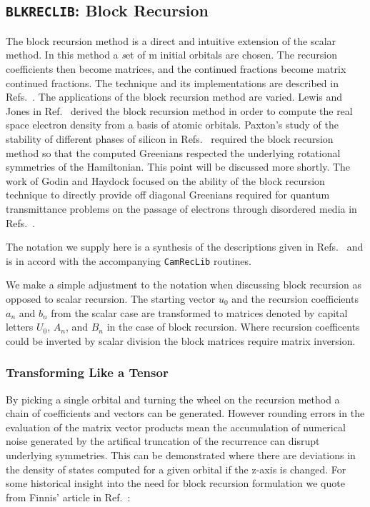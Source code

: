 \subsection{\texttt{BLKRECLIB}: Block Recursion}
The block recursion method is a direct and intuitive extension of the scalar method.
In this method a {\emph set of m} initial orbitals are chosen. The recursion
coefficients then become matrices, and the continued fractions become
matrix continued fractions. The technique and its implementations are described 
in Refs.~\cite{jones84, legrand85, inoue87, nex89, godin91}. 
The applications of the block recursion method are varied.
Lewis and Jones in Ref.~\cite{jones84} derived the block recursion method
in order to compute the real space electron density from a basis of atomic orbitals.
Paxton's study of the stability of different phases of silicon in 
Refs.~\cite{paxton87, paxton88} required the block recursion method so that
the computed Greenians respected the underlying rotational symmetries of the 
Hamiltonian. This point will be discussed more shortly. The work of 
Godin and Haydock focused on the ability of the block recursion technique
to directly provide off diagonal Greenians required for quantum transmittance problems
on the passage of electrons through disordered media in Refs.~\cite{godin86, godin88}. 

The notation we supply here is a synthesis of the descriptions 
given in Refs.~\cite{paxton88, nex89} and is in 
accord with the accompanying \texttt{CamRecLib} routines.

We make a simple adjustment to the notation when discussing
block recursion as opposed to scalar recursion.
The starting vector $u_{0}$ and the recursion coefficients
$a_{n}$ and $b_{n}$ from the scalar case are transformed to
matrices denoted by capital letters $U_{0}$, $A_{n}$, and $B_{n}$
in the case of block recursion. Where recursion coefficents could be
inverted by scalar division the block matrices require matrix inversion.

\subsubsection{Transforming Like a Tensor}
By picking a single orbital and turning the wheel on the recursion method a
chain of coefficients and vectors can be generated. However rounding errors in the evaluation
of the matrix vector products mean the accumulation of numerical noise
generated by the artifical truncation of the recurrence
can disrupt underlying symmetries. This can be demonstrated where there are 
deviations in the density of states computed for a given orbital if the z-axis 
is changed. For some historical insight into the need for block recursion formulation
we quote from Finnis' article in Ref.~\cite{andersen89}:

